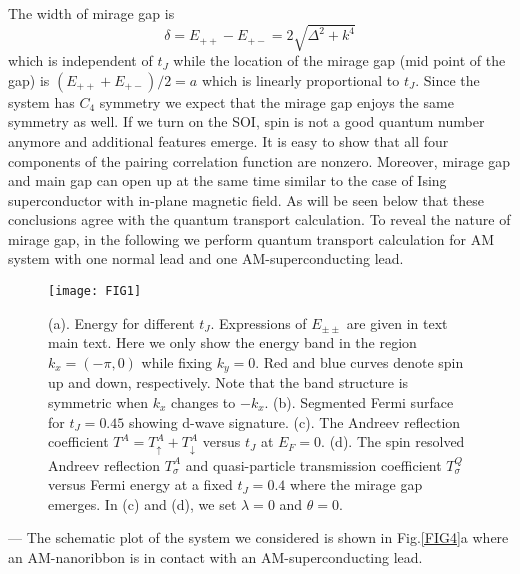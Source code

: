 \documentclass[aps, prb, twocolumn, amssymb, amsmath, showpacs, superscriptaddress]{revtex4-1}
\begin{document}
The width of mirage gap is
\begin{equation}
\delta= E_{++} - E_{+-} = 2\sqrt{\Delta^2 +k^4}\label{width}
\end{equation}
which is independent of $t_J$ while the location of the mirage gap (mid point of the gap) is $(E_{++} + E_{+-})/2 = a$ which is linearly proportional to $t_J$. Since the system has $C_4$ symmetry we expect that the mirage gap enjoys the same symmetry as well.
If we turn on the SOI, spin is not a good quantum number anymore and additional features emerge. It is easy to show that all four components of the pairing correlation function are nonzero. Moreover, mirage gap and main gap can open up at the same time similar to the case of Ising superconductor with in-plane magnetic field\cite{GM-Tang}.
As will be seen below that these conclusions agree with the quantum transport calculation. To reveal the nature of mirage gap, in the following we perform quantum transport calculation for AM system with one normal lead and one AM-superconducting lead.

\begin{figure}[ht!]
\centering
\texttt{[image: FIG1]}
\caption{
\label{FIG1}
(a). Energy for different $t_J$. Expressions of $E_{\pm\pm}$ are given in text main text. Here we only show the energy band in the region $k_x=(-\pi,0)$ while fixing $k_y=0$. Red and blue curves denote spin up and down, respectively. Note that the band structure is symmetric when $k_x$ changes to $-k_x$. (b). Segmented Fermi surface for $t_J=0.45$ showing d-wave signature. (c). The Andreev reflection coefficient $T^A = T^A_\uparrow + T^A_\downarrow$ versus $t_J$ at $E_F=0$.  (d). The spin resolved Andreev reflection $T^A_\sigma$ and quasi-particle transmission coefficient $T^Q_\sigma$ versus Fermi energy at a fixed $t_J=0.4$ where the mirage gap emerges. In (c) and (d), we set $\lambda=0$ and $\theta=0$.
}
\end{figure}

\bigskip

 ---
The schematic plot of the system we considered is shown in Fig.\ref{FIG4}a where an AM-nanoribbon is in contact with an AM-superconducting lead.
\end{document}
